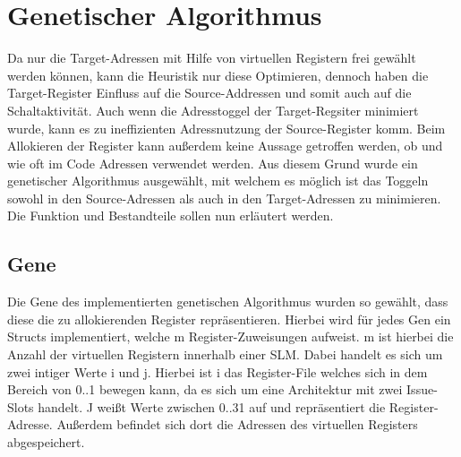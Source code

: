 \section{Genetischer Algorithmus}
\label{sec:genetischerAlgorithmus}
Da nur die Target-Adressen mit Hilfe von virtuellen Registern frei gewählt werden können, kann die Heuristik nur diese Optimieren, dennoch haben die Target-Register Einfluss auf die Source-Addressen und somit auch auf die Schaltaktivität. Auch wenn die Adresstoggel der Target-Regsiter minimiert wurde, kann es zu ineffizienten Adressnutzung der Source-Register komm. Beim Allokieren der Register kann außerdem keine Aussage getroffen werden, ob und wie oft im Code Adressen verwendet werden. Aus diesem Grund wurde ein genetischer Algorithmus ausgewählt, mit welchem es möglich ist das Toggeln sowohl in den Source-Adressen als auch in den Target-Adressen zu minimieren. Die Funktion und Bestandteile sollen nun erläutert werden.

\subsection{Gene}
Die Gene des implementierten genetischen Algorithmus wurden so gewählt, dass diese die zu allokierenden Register repräsentieren. Hierbei wird für jedes Gen ein Structs implementiert, welche m Register-Zuweisungen aufweist. m ist hierbei die Anzahl der virtuellen Registern innerhalb einer SLM. Dabei handelt es sich um zwei intiger Werte i und j. Hierbei ist i das Register-File welches sich in dem Bereich von 0..1 bewegen kann, da es sich um eine Architektur mit zwei Issue-Slots handelt. J weißt Werte zwischen 0..31 auf und repräsentiert die Register-Adresse. Außerdem befindet sich dort die Adressen des virtuellen Registers abgespeichert.
 
